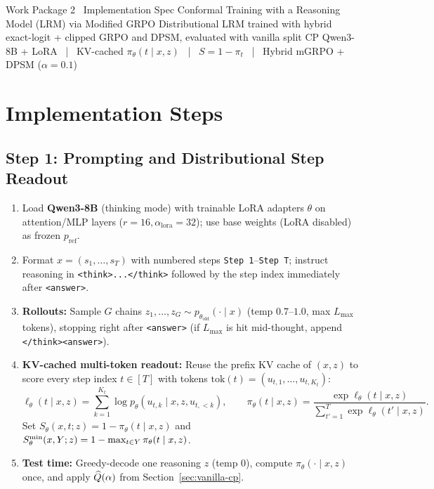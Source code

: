 \documentclass[10pt,a4paper]{article}
\begin{document}
\wpheader
  {Work Package 2 \textperiodcentered\ Implementation Spec}
  {Conformal Training with a Reasoning Model (LRM) via Modified GRPO}
  {Distributional LRM trained with hybrid exact-logit + clipped GRPO and DPSM, evaluated with vanilla split CP}
  { Qwen3-8B + LoRA \ \textcolor{rulegray}{|}\ 
    KV-cached $\pi_\theta(t\mid x,z)$ \ \textcolor{rulegray}{|}\ 
    $S=1-\pi_t$ \ \textcolor{rulegray}{|}\ 
    Hybrid mGRPO + DPSM ($\alpha=0.1$)}

\section{Implementation Steps}

\subsection{Step 1: Prompting and Distributional Step Readout}
\begin{enumerate}
\item Load \textbf{Qwen3-8B} (thinking mode) with trainable LoRA adapters $\theta$ on attention/MLP layers ($r=16, \alpha_{\mathrm{lora}}=32$); use base weights (LoRA disabled) as frozen $p_{\mathrm{ref}}$.
\item Format $x=(s_1,\dots,s_T)$ with numbered steps \texttt{Step 1}--\texttt{Step T}; instruct reasoning in \texttt{<think>...</think>} followed by the step index immediately after \texttt{<answer>}.
\item \textbf{Rollouts:} Sample $G$ chains $z_1,\dots,z_G\sim p_{\theta_{\mathrm{old}}}(\cdot\mid x)$ (temp $0.7$--$1.0$, max $L_{\max}$ tokens), stopping right after \texttt{<answer>} (if $L_{\max}$ is hit mid-thought, append \texttt{</think><answer>}).
\item \textbf{KV-cached multi-token readout:} Reuse the prefix KV cache of $(x,z)$ to score every step index $t\in[T]$ with tokens $\mathrm{tok}(t)=(u_{t,1},\dots,u_{t,K_t})$:
\begin{equation}
\ell_\theta(t\mid x,z) = \sum_{k=1}^{K_t}\log p_\theta(u_{t,k}\mid x,z,u_{t,<k}), \qquad
\pi_\theta(t\mid x,z) = \frac{\exp \ell_\theta(t\mid x,z)}{\sum_{t'=1}^{T}\exp \ell_\theta(t'\mid x,z)}. \label{eq:wp2-dist}
\end{equation}
Set $S_\theta(x,t;z)=1-\pi_\theta(t\mid x,z)$ and $S^{\min}_\theta(x,Y;z)=1-\max_{t\in Y}\pi_\theta(t\mid x,z)$.
\item \textbf{Test time:} Greedy-decode one reasoning $z$ (temp $0$), compute $\pi_\theta(\cdot\mid x,z)$ once, and apply $\widehat Q(\alpha)$ from Section~\ref{sec:vanilla-cp}.
\end{enumerate}
\end{document}
